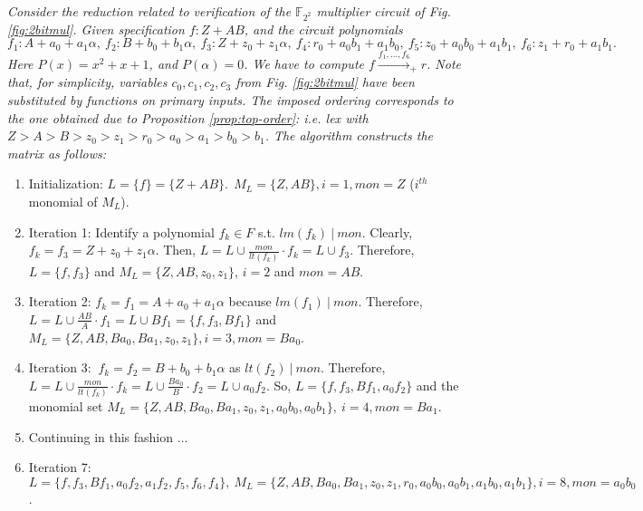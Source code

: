 \begin{Example}
\label{ex:f4}
{\it 
Consider the reduction related to verification of the ${\mathbb{F}}_{2^2}$
multiplier circuit of Fig. \ref{fig:2bitmul}. Given specification $f:
Z + A B$, and the circuit polynomials $f_1:A + a_0 + a_1 \alpha,
~f_2: B + b_0 + b_1 \alpha,
~f_3: Z + z_0 + z_1 \alpha,
~f_4: r_0 + a_0b_1 + a_1b_0,
~f_5: z_0 + a_0b_0 + a_1b_1,
~f_6: z_1 + r_0 +a_1b_1.$
Here  $P(x) = x^2 + x + 1$, and  $P(\alpha) = 0$. We have to compute
$f \xrightarrow{f_1, \dots, f_6}_+r$.  Note that, for simplicity, 
variables $c_0, c_1, c_2, c_3$ from Fig. \ref{fig:2bitmul} have been
substituted by functions on primary inputs. The imposed ordering
corresponds to the one obtained due to Proposition
\ref{prop:top-order}: i.e. {\it lex} with $Z > A > B > z_0 > z_1 > r_0
> a_0 > a_1 > b_0 > b_1$. The algorithm constructs the matrix as
follows:  

\begin{enumerate}

\item Initialization: $L = \{f\} = \{Z + AB\}. ~~M_L = \{Z, AB\}, i =
  1, mon = Z$ ($i^{th}$ monomial of $M_L$).
\item Iteration 1: Identify a polynomial $f_k \in F$ s.t. $lm(f_k) ~|~
  mon$. Clearly, $f_k = f_3 = Z + z_0 + z_1 \alpha$. Then, $L = L \cup
  \frac{mon}{lt(f_k)} \cdot f_k = L \cup f_3$. Therefore, $L = \{f,
  f_3\}$ and $M_L = \{Z, AB, z_0, z_1\}$, $ i = 2$ and $mon = AB$.
\item Iteration 2: $f_k = f_1 = A + a_0 + a_1\alpha$ because $lm(f_1) ~|~
  mon$. Therefore, $L = L \cup \frac{AB}{A} \cdot f_1 = L \cup Bf_1 =
  \{f, f_3, Bf_1\}$ and $M_L = \{Z, AB, Ba_0, Ba_1, z_0 , z_1\}, i =
  3, mon = Ba_0$. 
\item Iteration 3: $~f_k = f_2 = B + b_0 + b_1\alpha$ as $lt(f_2)
  ~|~ mon$. Therefore, $L = L \cup \frac{mon}{lt(f_k)} \cdot f_k = L
  \cup \frac{Ba_0}{B} \cdot f_2 = L \cup a_0f_2$. So, $L = \{f, f_3,
  Bf_1, a_0f_2\}$ and the monomial set $M_L = \{Z, AB, Ba_0, Ba_1,
  z_0, z_1, a_0b_0, a_0b_1\}, ~i = 4, mon = Ba_1$.
\item Continuing in this fashion $\dots$


\item Iteration 7: $L = \{f, f_3, Bf_1, a_0f_2, a_1f_2, f_5, f_6,
  f_4\}, ~M_L = \{Z, AB, Ba_0, Ba_1, z_0, z_1, r_0, a_0b_0, a_0b_1,
  a_1b_0, a_1b_1\}, i = 8, mon = a_0b_0$. 


\end{enumerate}}
\end{Example}
